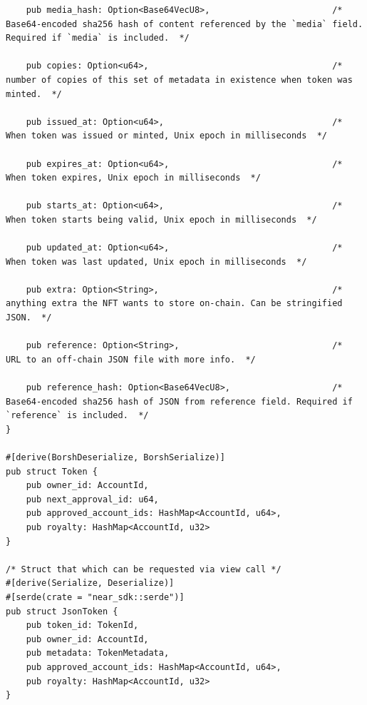 \begin{verbatim}
    pub media_hash: Option<Base64VecU8>,                        /*  Base64-encoded sha256 hash of content referenced by the `media` field. Required if `media` is included.  */

    pub copies: Option<u64>,                                    /*  number of copies of this set of metadata in existence when token was minted.  */

    pub issued_at: Option<u64>,                                 /*  When token was issued or minted, Unix epoch in milliseconds  */

    pub expires_at: Option<u64>,                                /*  When token expires, Unix epoch in milliseconds  */

    pub starts_at: Option<u64>,                                 /*  When token starts being valid, Unix epoch in milliseconds  */

    pub updated_at: Option<u64>,                                /*  When token was last updated, Unix epoch in milliseconds  */

    pub extra: Option<String>,                                  /*  anything extra the NFT wants to store on-chain. Can be stringified JSON.  */

    pub reference: Option<String>,                              /*  URL to an off-chain JSON file with more info.  */

    pub reference_hash: Option<Base64VecU8>,                    /*  Base64-encoded sha256 hash of JSON from reference field. Required if `reference` is included.  */
}

#[derive(BorshDeserialize, BorshSerialize)]
pub struct Token {
    pub owner_id: AccountId,
    pub next_approval_id: u64,
    pub approved_account_ids: HashMap<AccountId, u64>,
    pub royalty: HashMap<AccountId, u32>
}

/* Struct that which can be requested via view call */
#[derive(Serialize, Deserialize)]
#[serde(crate = "near_sdk::serde")]
pub struct JsonToken {
    pub token_id: TokenId,
    pub owner_id: AccountId,
    pub metadata: TokenMetadata,
    pub approved_account_ids: HashMap<AccountId, u64>,
    pub royalty: HashMap<AccountId, u32>
}
\end{verbatim}

